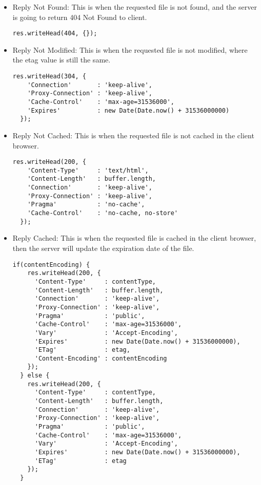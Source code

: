 \begin{itemize}
\item Reply Not Found: This is when the requested file is not found, and the server is going to return 404 Not Found to client.  

\begin{lstlisting}
res.writeHead(404, {});
\end{lstlisting}

\item Reply Not Modified: This is when the requested file is not modified, where the etag value is still the same. 

\begin{lstlisting}
res.writeHead(304, {
    'Connection'       : 'keep-alive',
    'Proxy-Connection' : 'keep-alive',
    'Cache-Control'    : 'max-age=31536000',
    'Expires'          : new Date(Date.now() + 31536000000)
  });
\end{lstlisting}

\item Reply Not Cached: This is when the requested file is not cached in the client browser. 

\begin{lstlisting}
res.writeHead(200, {
    'Content-Type'     : 'text/html',
    'Content-Length'   : buffer.length,
    'Connection'       : 'keep-alive',
    'Proxy-Connection' : 'keep-alive',
    'Pragma'           : 'no-cache',
    'Cache-Control'    : 'no-cache, no-store'
  });
\end{lstlisting}

\item Reply Cached: This is when the requested file is cached in the client browser, then the server will update the expiration date of the file.

\begin{lstlisting}
if(contentEncoding) {
    res.writeHead(200, {
      'Content-Type'     : contentType,
      'Content-Length'   : buffer.length,
      'Connection'       : 'keep-alive',
      'Proxy-Connection' : 'keep-alive',
      'Pragma'           : 'public',
      'Cache-Control'    : 'max-age=31536000',
      'Vary'             : 'Accept-Encoding',
      'Expires'          : new Date(Date.now() + 31536000000),
      'ETag'             : etag,
      'Content-Encoding' : contentEncoding
    });
  } else {
    res.writeHead(200, {
      'Content-Type'     : contentType,
      'Content-Length'   : buffer.length,
      'Connection'       : 'keep-alive',
      'Proxy-Connection' : 'keep-alive',
      'Pragma'           : 'public',
      'Cache-Control'    : 'max-age=31536000',
      'Vary'             : 'Accept-Encoding',
      'Expires'          : new Date(Date.now() + 31536000000),
      'ETag'             : etag
    });
  }\end{lstlisting}

\end{itemize}


